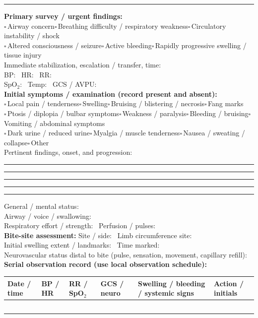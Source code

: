 \documentclass[10pt,a4paper]{article}
\newcommand{\boxx}{\ensuremath{\square}}
\newcommand{\checkitem}[1]{\boxx\,#1\quad}
\newcommand{\linefield}[2]{#1\ \underline{\hspace{#2}}}
\newcommand{\ruledline}{\par\noindent\rule{\linewidth}{0.35pt}\par\vspace{3mm}}
\newcommand{\sectionbar}[1]{\vspace{3pt}{\large\bfseries #1}\par\vspace{1pt}\hrule\vspace{3pt}}
\begin{document}
\sectionbar{3. Immediate assessment and initial findings}
\textbf{Primary survey / urgent findings:}\\
\checkitem{Airway concern}\checkitem{Breathing difficulty / respiratory weakness}\checkitem{Circulatory instability / shock}\\
\checkitem{Altered consciousness / seizure}\checkitem{Active bleeding}\checkitem{Rapidly progressive swelling / tissue injury}\\
\linefield{Immediate stabilization, escalation / transfer, time:}{5.5cm}\\
\linefield{BP:}{2.0cm} \linefield{HR:}{2.0cm} \linefield{RR:}{2.0cm}\\
\linefield{SpO$_2$:}{2.0cm} \linefield{Temp:}{2.0cm} \linefield{GCS / AVPU:}{2.2cm}\\
\textbf{Initial symptoms / examination (record present and absent):}\\
\checkitem{Local pain / tenderness}\checkitem{Swelling}\checkitem{Bruising / blistering / necrosis}\checkitem{Fang marks}\\
\checkitem{Ptosis / diplopia / bulbar symptoms}\checkitem{Weakness / paralysis}\checkitem{Bleeding / bruising}\checkitem{Vomiting / abdominal symptoms}\\
\checkitem{Dark urine / reduced urine}\checkitem{Myalgia / muscle tenderness}\checkitem{Nausea / sweating / collapse}\checkitem{Other}\\
\linefield{Pertinent findings, onset, and progression:}{7.5cm}
\ruledline\ruledline\ruledline\ruledline

\newpage
\sectionbar{4. Examination and serial observation}
\linefield{General / mental status:}{7.0cm}\\
\linefield{Airway / voice / swallowing:}{7.0cm}\\
\linefield{Respiratory effort / strength:}{5.0cm} \linefield{Perfusion / pulses:}{5.0cm}\\
\textbf{Bite-site assessment:} \linefield{Site / side:}{3.5cm} \linefield{Limb circumference site:}{3.2cm}\\
\linefield{Initial swelling extent / landmarks:}{7.2cm} \linefield{Time marked:}{2.5cm}\\
\linefield{Neurovascular status distal to bite (pulse, sensation, movement, capillary refill):}{2.0cm}\\
\textbf{Serial observation record (use local observation schedule):}\\
\begin{tabularx}{\linewidth}{|p{1.8cm}|p{1.7cm}|p{1.7cm}|p{1.7cm}|X|p{1.8cm}|}
\hline
Date / time & BP / HR & RR / SpO$_2$ & GCS / neuro & Swelling / bleeding / systemic signs & Action / initials \\
\hline
\rule{0pt}{8mm} & & & & & \\\hline
\rule{0pt}{8mm} & & & & & \\\hline
\rule{0pt}{8mm} & & & & & \\\hline
\rule{0pt}{8mm} & & & & & \\\hline
\rule{0pt}{8mm} & & & & & \\\hline
\end{tabularx}
\end{document}
